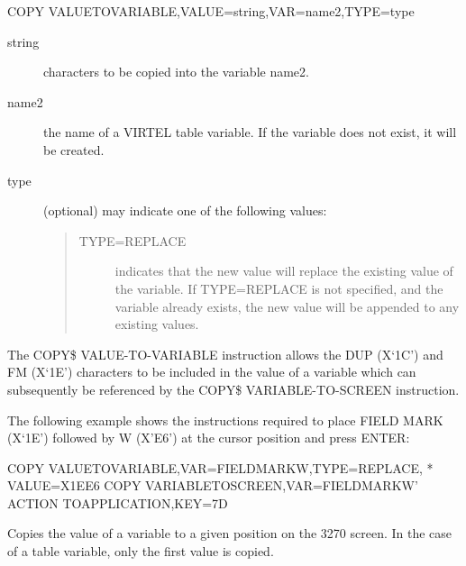 \documentclass[letterpaper,10pt,english]{sphinxmanual}
\begin{document}
\begin{sphinxVerbatim}[commandchars=\\\{\}]
COPY\PYGZdl{} VALUE\PYGZhy{}TO\PYGZhy{}VARIABLE,VALUE=\PYGZsq{}string\PYGZsq{},VAR=\PYGZsq{}name2\PYGZsq{},TYPE=type
\end{sphinxVerbatim}
\begin{description}
\item[{string}] \leavevmode
characters to be copied into the variable name2.

\item[{name2}] \leavevmode
the name of a VIRTEL table variable. If the variable does not exist, it will be created.

\item[{type}] \leavevmode
(optional) may indicate one of the following values:
\begin{quote}
\begin{description}
\item[{TYPE=REPLACE}] \leavevmode
indicates that the new value will replace the existing value of the variable. If TYPE=REPLACE is not specified, and the variable already exists, the new value will be appended to any existing values.

\end{description}
\end{quote}

\end{description}

The COPY\$ VALUE-TO-VARIABLE instruction allows the DUP (X‘1C’) and FM (X‘1E’) characters to be included in the value of a variable which can subsequently be referenced by the COPY\$ VARIABLE-TO-SCREEN instruction.

The following example shows the instructions required to place FIELD MARK (X‘1E’) followed by W (X’E6’) at the cursor position and press ENTER:

\begin{sphinxVerbatim}[commandchars=\\\{\}]
COPY\PYGZdl{} VALUE\PYGZhy{}TO\PYGZhy{}VARIABLE,VAR=\PYGZsq{}FIELDMARK\PYGZhy{}W\PYGZsq{},TYPE=REPLACE,                    *
        VALUE=X\PYGZsq{}1EE6\PYGZsq{}
COPY\PYGZdl{} VARIABLE\PYGZhy{}TO\PYGZhy{}SCREEN,VAR=\PYGZsq{}FIELDMARK\PYGZhy{}W’
ACTION\PYGZdl{} TO\PYGZhy{}APPLICATION,KEY=7D
\end{sphinxVerbatim}


Copies the value of a variable to a given position on the 3270 screen. In the case of a table variable, only the first value is copied.
\end{document}
